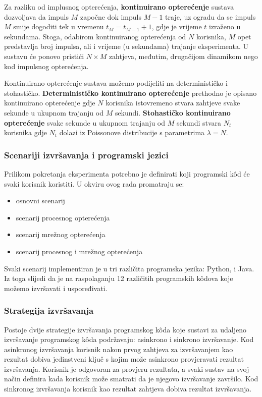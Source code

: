\documentclass[times, utf8, diplomski]{fer}
\begin{document}
Za razliku od implusnog opterećenja, \textbf{kontinuirano opterećenje} sustava dozvoljava da impuls $M$ započne dok impuls $M-1$ traje, uz ogradu da se impuls $M$ smije dogoditi tek u vremenu $t_{M} = t_{M-1} + 1$, gdje je vrijeme $t$ izraženo u sekundama. Stoga, odabirom kontinuiranog opterećenja od $N$ korisnika, $M$ opet predstavlja broj impulsa, ali i vrijeme (u sekundama) trajanje eksperimenta. U sustavu će ponovo pristići $N \times M$ zahtjeva, međutim, drugačijom dinamikom nego kod impulsnog opterećenja.

Kontinuirano opterećenje sustava možemo podijeliti na determinističko i stohastičko. \textbf{Determinističko kontinuirano opterećenje} prethodno je opisano kontinuirano opterećenje gdje $N$ korisnika istovremeno stvara zahtjeve svake sekunde u ukupnom trajanju od $M$ sekundi. \textbf{Stohastičko kontinuirano opterećenje} svake sekunde u ukupnom trajanju od $M$ sekundi stvara $N_t$ korisnika gdje $N_t$ dolazi iz Poissonove distribucije s parametrima $\lambda = N$.

\subsubsection{Scenariji izvršavanja i programski jezici}
Prilikom pokretanja eksperimenta potrebno je definirati koji programski kôd će svaki korisnik koristiti. U okviru ovog rada promatraju se:
\begin{itemize}
    \item osnovni scenarij
    \item scenarij procesnog opterećenja
    \item scenarij mrežnog opterećenja
    \item scenarij procesnog i mrežnog opterećenja
\end{itemize}

Svaki scenarij implementiran je u tri različita programska jezika: Python,  i Java. Iz toga slijedi da je na raspolaganju 12 različitih programskih kôdova koje možemo izvršavati i uspoređivati.

\subsubsection{Strategija izvršavanja}
Postoje dvije strategije izvršavanja programskog kôda koje sustavi za udaljeno izvršavanje programskog kôda podržavaju: asinkrono i sinkrono izvršavanje. Kod asinkronog izvršavanja korisnik nakon prvog zahtjeva za izvršavanjem kao rezultat dobiva jedinstveni ključ  s kojim može asinkrono provjeravati rezultat izvršavanja. Korisnik je odgovoran za provjeru rezultata, a svaki sustav na svoj način definira kada korisnik može smatrati da je njegovo izvršavanje završilo. Kod sinkronog izvršavanja korisnik kao rezultat zahtjeva dobiva rezultat izvršavanja.
\end{document}
